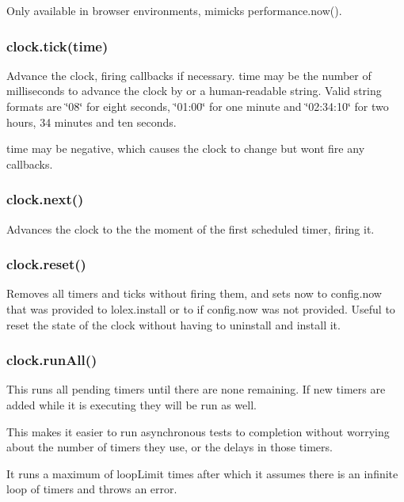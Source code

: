 Only available in browser environments, mimicks performance.\+now().

\subsubsection*{{\ttfamily clock.\+tick(time)}}

Advance the clock, firing callbacks if necessary. {\ttfamily time} may be the number of milliseconds to advance the clock by or a human-\/readable string. Valid string formats are {\ttfamily \char`\"{}08\char`\"{}} for eight seconds, {\ttfamily \char`\"{}01\+:00\char`\"{}} for one minute and {\ttfamily \char`\"{}02\+:34\+:10\char`\"{}} for two hours, 34 minutes and ten seconds.

{\ttfamily time} may be negative, which causes the clock to change but won\textquotesingle{}t fire any callbacks.

\subsubsection*{{\ttfamily clock.\+next()}}

Advances the clock to the the moment of the first scheduled timer, firing it.

\subsubsection*{{\ttfamily clock.\+reset()}}

Removes all timers and ticks without firing them, and sets {\ttfamily now} to {\ttfamily config.\+now} that was provided to {\ttfamily lolex.\+install} or to {} if {\ttfamily config.\+now} was not provided. Useful to reset the state of the clock without having to {\ttfamily uninstall} and {\ttfamily install} it.

\subsubsection*{{\ttfamily clock.\+run\+All()}}

This runs all pending timers until there are none remaining. If new timers are added while it is executing they will be run as well.

This makes it easier to run asynchronous tests to completion without worrying about the number of timers they use, or the delays in those timers.

It runs a maximum of {\ttfamily loop\+Limit} times after which it assumes there is an infinite loop of timers and throws an error.

